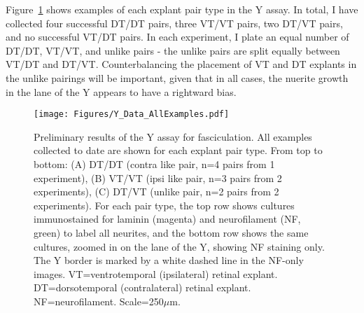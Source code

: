 Figure~\ref{Figures/YDataAllExamples} shows examples of each explant pair type in the Y assay.
In total, I have collected four successful DT/DT pairs, three VT/VT pairs, two DT/VT pairs, and no successful VT/DT pairs.
In each experiment, I plate an equal number of DT/DT, VT/VT, and unlike pairs - the unlike pairs are split equally between VT/DT and DT/VT.
Counterbalancing the placement of VT and DT explants in the unlike pairings will be important, given that in all cases, the nuerite growth in the lane of the Y appears to have a rightward bias.
\begin{figure}[hbtp]
    \begin{center}
        \texttt{[image: Figures/Y\_Data\_AllExamples.pdf]}
        \caption[Preliminary results of the Y assay for fasciculation.]
        {Preliminary results of the Y assay for fasciculation.
        All examples collected to date are shown for each explant pair type.
        From top to bottom: (A) DT/DT (contra like pair, n=4 pairs from 1 experiment), (B) VT/VT (ipsi like pair, n=3 pairs from 2 experiments), (C) DT/VT (unlike pair, n=2 pairs from 2 experiments).
        For each pair type, the top row shows cultures immunostained for laminin (magenta) and neurofilament (NF, green) to label all neurites, and the bottom row shows the same cultures, zoomed in on the lane of the Y, showing NF staining only.
        The Y border is marked by a white dashed line in the NF-only images.
        VT=ventrotemporal (ipsilateral) retinal explant.
        DT=dorsotemporal (contralateral) retinal explant.
        NF=neurofilament.
        Scale=250$\mu$m.
        }
        \label{Figures/YDataAllExamples}
    \end{center}
\end{figure}

